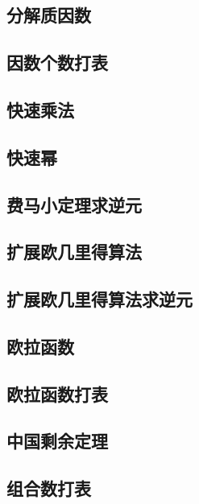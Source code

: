 \documentclass[a4paper, 12pt, twoside]{article}
\begin{document}
\subsection{分解质因数}

\subsection{因数个数打表}

\subsection{快速乘法}

\subsection{快速幂}

\subsection{费马小定理求逆元}

\subsection{扩展欧几里得算法}

\subsection{扩展欧几里得算法求逆元}

\subsection{欧拉函数}

\subsection{欧拉函数打表}

\subsection{中国剩余定理}

\subsection{组合数打表}

\end{document}
